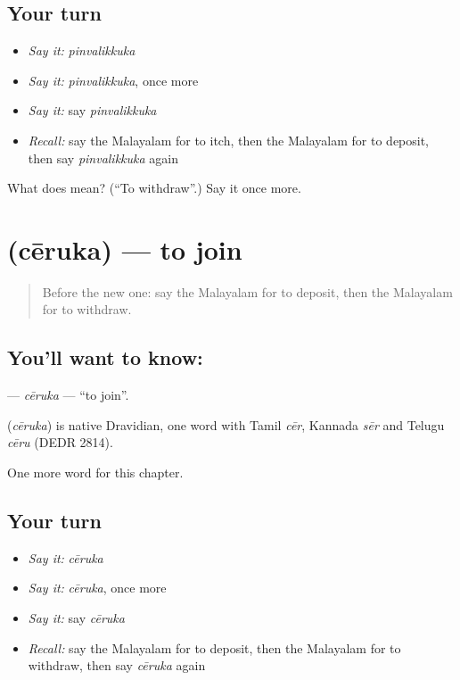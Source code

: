 \subsection*{Your turn}
\begin{itemize}
\raggedright
  \item \emph{Say it:} \emph{pinvalikkuka}
  \item \emph{Say it:} \emph{pinvalikkuka}, once more
  \item \emph{Say it:} say \emph{pinvalikkuka}
  \item \emph{Recall:} say the Malayalam for to itch, then the Malayalam for to deposit, then say \emph{pinvalikkuka} again
\end{itemize}

\begin{tcolorbox}[breakable,colback=teal!4,colframe=teal!35!black,title={Before you move on}]
What does  mean? (\textquotedblleft{}To withdraw\textquotedblright{}.) Say it once more.
\end{tcolorbox}
\section[\texorpdfstring{\ml{ചേരുക} (cēruka)}{ചേരുക (cēruka)}]{ (cēruka) — to join}

\label{lesson:ML-C305-ceruka}



\begin{quote}
Before the new one: say the Malayalam for to deposit, then the Malayalam for to withdraw.
\end{quote}

\subsection*{You'll want to know: }
\textbf{} — \emph{cēruka} — \textquotedblleft{}to join\textquotedblright{}.

\begin{cousinweb}
\textbf{} (\emph{cēruka}) is native Dravidian, one word with Tamil \emph{cēr}, Kannada \emph{sēr} and Telugu \emph{cēru} (DEDR 2814).
\end{cousinweb}

\begin{grammarlens}[title={What you've built}]
One more word for this chapter.
\end{grammarlens}

\subsection*{Your turn}
\begin{itemize}
\raggedright
  \item \emph{Say it:} \emph{cēruka}
  \item \emph{Say it:} \emph{cēruka}, once more
  \item \emph{Say it:} say \emph{cēruka}
  \item \emph{Recall:} say the Malayalam for to deposit, then the Malayalam for to withdraw, then say \emph{cēruka} again
\end{itemize}

